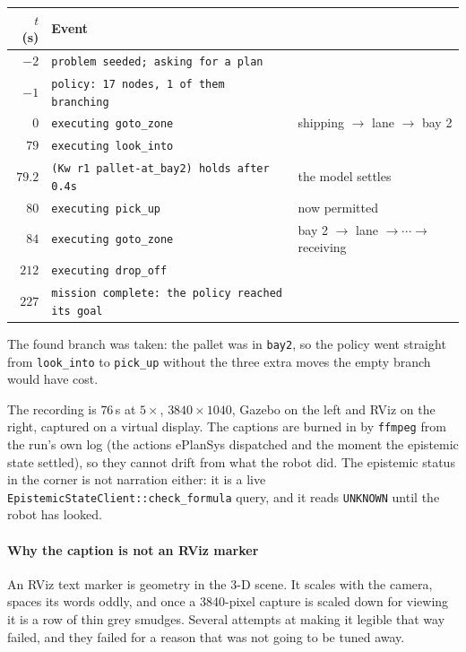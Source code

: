 \documentclass[11pt,a4paper]{article}
\theoremstyle{definition}
\newcommand{\code}[1]{\texttt{\small #1}}
\begin{document}
\begin{center}
\begin{tabular}{@{}rll@{}}
\toprule
$t$ (s) & Event & \\
\midrule
$-2$ & \code{problem seeded; asking for a plan} & \\
$-1$ & \code{policy: 17 nodes, 1 of them branching} & \\
$0$ & \code{executing goto\_zone} & shipping $\rightarrow$ lane $\rightarrow$ bay 2 \\
$79$ & \code{executing look\_into} & \\
$79.2$ & \code{(Kw r1 pallet-at\_bay2) holds after 0.4s} & the model settles \\
$80$ & \code{executing pick\_up} & now permitted \\
$84$ & \code{executing goto\_zone} & bay 2 $\rightarrow$ lane $\rightarrow \cdots \rightarrow$ receiving \\
$212$ & \code{executing drop\_off} & \\
$227$ & \code{mission complete: the policy reached its goal} & \\
\bottomrule
\end{tabular}
\end{center}

The found branch was taken: the pallet was in \code{bay2}, so the policy went
straight from \code{look\_into} to \code{pick\_up} without the three extra
moves the empty branch would have cost.

The recording is $76$\,s at $5\times$, $3840 \times 1040$, Gazebo on the left
and RViz on the right, captured on a virtual display. The captions are burned
in by \code{ffmpeg} from the run's own log (the actions ePlanSys dispatched and
the moment the epistemic state settled), so they cannot drift from what the
robot did. The epistemic status in the corner is not narration either: it
is a live \code{EpistemicStateClient::check\_formula} query, and it reads
\code{UNKNOWN} until the robot has looked.

\paragraph{Why the caption is not an RViz marker} An RViz text marker is
geometry in the 3-D scene. It scales with the camera, spaces its words oddly,
and once a 3840-pixel capture is scaled down for viewing it is a row of thin
grey smudges. Several attempts at making it legible that way failed, and they
failed for a reason that was not going to be tuned away.
\end{document}
